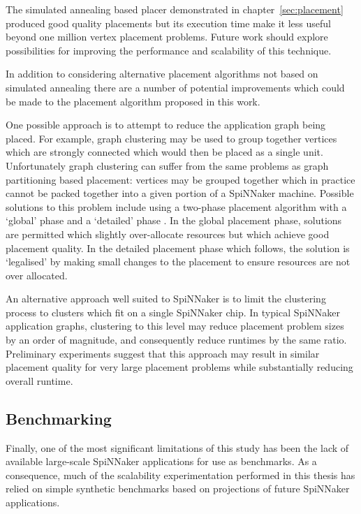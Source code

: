 			The simulated annealing based placer demonstrated in
			chapter~\ref{sec:placement} produced good quality placements but its
			execution time make it less useful beyond one million vertex placement
			problems. Future work should explore possibilities for improving the
			performance and scalability of this technique.
			
			In addition to considering alternative placement algorithms not based on
			simulated annealing there are a number of potential improvements which
			could be made to the placement algorithm proposed in this work.
			
			One possible approach is to attempt to reduce the application graph being
			placed. For example, graph clustering \cite{schaeffer07} may be used to
			group together vertices which are strongly connected which would then be
			placed as a single unit.  Unfortunately graph clustering can suffer from
			the same problems as graph partitioning based placement: vertices may be
			grouped together which in practice cannot be packed together into a given
			portion of a SpiNNaker machine.  Possible solutions to this problem
			include using a two-phase placement algorithm with a `global' phase and a
			`detailed' phase \cite{kahng11}. In the global placement phase, solutions
			are permitted which slightly over-allocate resources but which achieve
			good placement quality. In the detailed placement phase which follows,
			the solution is `legalised' by making small changes to the placement to
			ensure resources are not over allocated.
			
			An alternative approach well suited to SpiNNaker is to limit the
			clustering process to clusters which fit on a single SpiNNaker chip. In
			typical SpiNNaker application graphs, clustering to this level may reduce
			placement problem sizes by an order of magnitude, and consequently reduce
			runtimes by the same ratio. Preliminary experiments suggest that this
			approach may result in similar placement quality for very large placement
			problems while substantially reducing overall runtime.
		
		\subsection{Benchmarking}
			
			Finally, one of the most significant limitations of this study has been
			the lack of available large-scale SpiNNaker applications for use as
			benchmarks. As a consequence, much of the scalability experimentation
			performed in this thesis has relied on simple synthetic benchmarks based
			on projections of future SpiNNaker applications.
			

